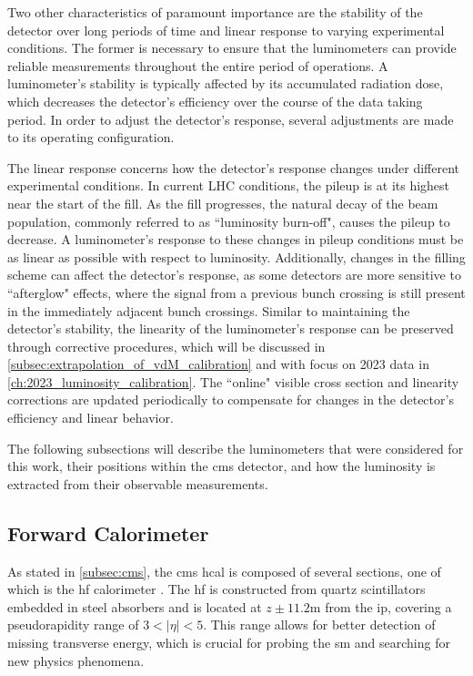Two other characteristics of paramount importance are the stability of the detector over long periods of time and linear response to varying experimental conditions. The former is necessary to ensure that the luminometers can provide reliable measurements throughout the entire period of operations. A luminometer’s stability is typically affected by its accumulated radiation dose, which decreases the detector’s efficiency over the course of the data taking period. In order to adjust the detector’s response, several adjustments are made to its operating configuration.

The linear response concerns how the detector’s response changes under different experimental conditions. In current LHC conditions, the pileup is at its highest near the start of the fill. As the fill progresses, the natural decay of the beam population, commonly referred to as ``luminosity burn-off", causes the pileup to decrease. A luminometer’s response to these changes in pileup conditions must be as linear as possible with respect to luminosity. Additionally, changes in the filling scheme can affect the detector’s response, as some detectors are more sensitive to ``afterglow" effects, where the signal from a previous bunch crossing is still present in the immediately adjacent bunch crossings. Similar to maintaining the detector's stability, the linearity of the luminometer’s response can be preserved through corrective procedures, which will be discussed in \autoref{subsec:extrapolation_of_vdM_calibration} and with focus on 2023 data in \autoref{ch:2023_luminosity_calibration}. The ``online" visible cross section and linearity corrections are updated periodically to compensate for changes in the detector's efficiency and linear behavior.

The following subsections will describe the luminometers that were considered for this work, their positions within the \acrshort{cms} detector, and how the luminosity is extracted from their observable measurements.

\subsection{Forward Calorimeter}

As stated in \autoref{subsec:cms}, the \acrshort{cms} \acrshort{hcal} is composed of several sections, one of which is the \acrfull{hf} calorimeter \cite{CMS:2012tda}. The \acrshort{hf} is constructed from quartz scintillators embedded in steel absorbers and is located at $z \pm 11.2$m from the \acrshort{ip}, covering a pseudorapidity range of $3 < |\eta| < 5$. This range allows for better detection of missing transverse energy, which is crucial for probing the \acrshort{sm} and searching for new physics phenomena.

